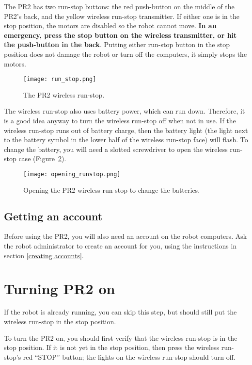 The PR2 has two run-stop buttons: the red push-button on the middle of the PR2's back, and 
the yellow wireless run-stop transmitter. If either one is in the stop position, the motors are disabled so the
robot cannot move. {\bf In an emergency, press the stop button on the wireless transmitter, or
hit the push-button in the back}. Putting either run-stop button in the stop position does not
damage the robot or turn off the computers, it simply stops the motors.


\begin{figure}[h]
\centering
\texttt{[image: run\_stop.png]}
\caption{The PR2 wireless run-stop.}
\label{fig:runstop}
\end{figure}

The wireless run-stop also uses battery power, which can run down.
Therefore, it is a good idea anyway to turn the wireless run-stop off when not in use.
If the wireless run-stop runs out of battery charge, then the battery light
(the light next to the battery symbol in the lower half of the wireless run-stop face)
will flash. To change the battery, you will need a slotted screwdriver to open
the wireless run-stop case (Figure~\ref{fig:opening-runstop}).

\begin{figure}[!h]
\centering
\texttt{[image: opening\_runstop.png]}
\caption{Opening the PR2 wireless run-stop to change the batteries.}
\label{fig:opening-runstop}
\end{figure}

\subsection{Getting an account}
Before using the PR2, you will also need an account on the robot computers. Ask the robot administrator to create an account for you, using the instructions 
in section \ref{creating accounts}.
\section{Turning PR2 on}
If the robot is already running, you can skip this step, but should still put the wireless run-stop in the stop position. 

To turn the PR2 on, you should first verify that the wireless run-stop is in the stop position. If it is not yet in the stop position, then press the wireless run-stop's red ``STOP'' button; the lights on the wireless run-stop should turn off. 

